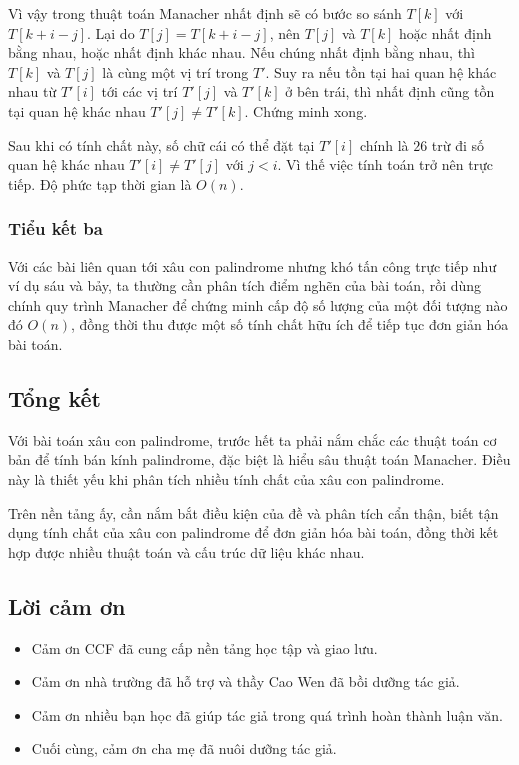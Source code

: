 \documentclass[11pt]{article}
\begin{document}
Vì vậy trong thuật toán Manacher nhất định sẽ có bước so sánh \(T[k]\) với
\(T[k+i-j]\). Lại do \(T[j]=T[k+i-j]\), nên \(T[j]\) và \(T[k]\) hoặc nhất định
bằng nhau, hoặc nhất định khác nhau. Nếu chúng nhất định bằng nhau, thì
\(T[k]\) và \(T[j]\) là cùng một vị trí trong \(T'\). Suy ra nếu tồn tại hai
quan hệ khác nhau từ \(T'[i]\) tới các vị trí \(T'[j]\) và \(T'[k]\) ở bên
trái, thì nhất định cũng tồn tại quan hệ khác nhau \(T'[j]\ne T'[k]\). Chứng
minh xong.

Sau khi có tính chất này, số chữ cái có thể đặt tại \(T'[i]\) chính là \(26\)
trừ đi số quan hệ khác nhau \(T'[i]\ne T'[j]\) với \(j<i\). Vì thế việc tính
toán trở nên trực tiếp. Độ phức tạp thời gian là \(O(n)\).

\subsubsection{Tiểu kết ba}

Với các bài liên quan tới xâu con palindrome nhưng khó tấn công trực tiếp như
ví dụ sáu và bảy, ta thường cần phân tích điểm nghẽn của bài toán, rồi dùng
chính quy trình Manacher để chứng minh cấp độ số lượng của một đối tượng nào đó
\(O(n)\), đồng thời thu được một số tính chất hữu ích để tiếp tục đơn giản hóa
bài toán.

\subsection{Tổng kết}

Với bài toán xâu con palindrome, trước hết ta phải nắm chắc các thuật toán cơ
bản để tính bán kính palindrome, đặc biệt là hiểu sâu thuật toán Manacher. Điều
này là thiết yếu khi phân tích nhiều tính chất của xâu con palindrome.

Trên nền tảng ấy, cần nắm bắt điều kiện của đề và phân tích cẩn thận, biết tận
dụng tính chất của xâu con palindrome để đơn giản hóa bài toán, đồng thời kết
hợp được nhiều thuật toán và cấu trúc dữ liệu khác nhau.

\subsection{Lời cảm ơn}

\begin{itemize}
  \item Cảm ơn CCF đã cung cấp nền tảng học tập và giao lưu.
  \item Cảm ơn nhà trường đã hỗ trợ và thầy Cao Wen đã bồi dưỡng tác giả.
  \item Cảm ơn nhiều bạn học đã giúp tác giả trong quá trình hoàn thành luận
  văn.
  \item Cuối cùng, cảm ơn cha mẹ đã nuôi dưỡng tác giả.
\end{itemize}
\end{document}
